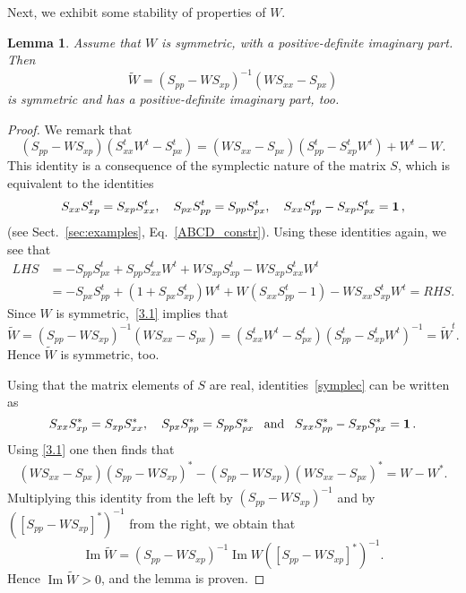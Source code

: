 \documentclass[12pt]{article}
\newtheorem{lemma}[theorem]{Lemma}
\renewcommand{\Im}{\operatorname{Im}}
\begin{document}
Next, we exhibit some stability of properties of $W$.
\begin{lemma}
\label{Wsymmetric}Assume that $W$ is symmetric, with a positive-definite imaginary part. Then 
$$\tilde W = (S_{pp} - W S_{xp})^{-1}(WS_{xx} - S_{px})$$ 
is symmetric and has a positive-definite imaginary part, too.
\end{lemma}
\begin{proof}
	We remark that
	\begin{equation}\label{3.1}
	(S_{pp} - W S_{xp})(S_{xx}^t W^t - S_{px}^t) = (W S_{xx} - S_{px})( S_{pp}^t - S_{xp}^t W^t) + W^t - W.
	\end{equation}
	This identity is a consequence of the symplectic nature of the matrix $S$, which is equivalent to the identities	
		\begin{equation}\label{symplec}
S_{xx} S_{xp}^t = S_{xp} S_{xx}^t, \quad S_{px} S_{pp}^t = S_{pp} S_{px}^t, 
\quad S_{xx} S_{pp}^t - S_{xp} S_{px}^t = {\bf{1}}\,,
\end{equation}
	(see Sect.~\ref{sec:examples}, Eq.~\eqref{ABCD_constr}). Using these identities again, we see that 
	\begin{align*}
	LHS &= - S_{pp} S_{px}^t + S_{pp} S_{xx}^t W^t + W S_{xp} 
	 S_{xp}^t  -  W S_{xp} S_{xx}^t W^t \\
	&=- S_{px}S_{pp}^t + (1+  S_{px}  S_{xp}^t) W^t + W(S_{xx}S_{pp}^t-1) - WS_{xx}S_{xp}^tW^t = RHS.
	\end{align*}
	Since $W$ is symmetric,~\eqref{3.1} implies that 
	\begin{equation*}
	\tilde W = (S_{pp} - W S_{xp})^{-1}(WS_{xx} - S_{px})= (S_{xx}^t W^t - S_{px}^t)(S_{pp}^t - S_{xp}^t W^t )^{-1} = 
	\tilde W^t.
	\end{equation*}
	Hence $\tilde W$ is symmetric, too.
	
	Using that the matrix elements of $S$ are real, identities~\eqref{symplec} can be written as 
	$$S_{xx} S_{xp}^* = S_{xp} S_{xx}^*, \quad S_{px} S_{pp}^* = S_{pp} S_{px}^* \,\,\, \text{  and  }\, \,\,
	S_{xx} S_{pp}^* - S_{xp} S_{px}^* = {\bf{1}}\,.$$ 
Using \eqref{3.1} one then finds that 
	\begin{align}\label{ping}
	(WS_{xx} -S_{px})(S_{pp}- WS_{xp})^* - (S_{pp}-WS_{xp})(WS_{xx} - S_{px})^* = W - W^*.
	\end{align}
	Multiplying this identity from the left by $(S_{pp} - WS_{xp})^{-1}$ and by 
	$([S_{pp} - WS_{xp}]^{*})^{-1}$ from the right, we obtain that 
	$$\Im\tilde W=(S_{pp}-WS_{xp})^{-1}\Im W {([S_{pp}-WS_{xp}]^{*})}^{-1}.$$
	Hence $\Im \tilde W>0$, and the lemma is proven.
\end{proof}
\end{document}
